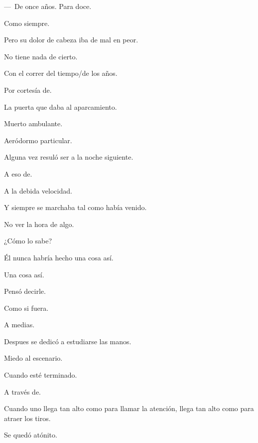 \sk
---~De once años. Para doce. 

\sk
Como siempre. 

\sk
Pero su dolor de cabeza iba de mal en peor. 

\sk
No tiene nada de cierto. 

\sk
Con el correr del tiempo/de los años. 

\sk
Por cortesía de. 

\sk
La puerta que daba al aparcamiento. 

\sk
Muerto ambulante. 

\sk
Aeródormo particular. 

\sk
Alguna vez resuló ser a la noche siguiente. 

\sk
A eso de. 

\sk
A la debida velocidad. 

\sk
Y siempre se marchaba tal como había venido. 

\sk
No ver la hora de algo. 

\sk
¿Cómo lo sabe? 

\sk
Él nunca habría hecho una cosa así.  

\sk
Una cosa así. 

\sk
Pensó decirle. 

\sk
Como si fuera. 

\sk
A medias. 

\sk
Despues se dedicó a estudiarse las manos. 

\sk
Miedo al escenario. 

\sk
Cuando esté terminado. 

\sk
A través de. 

\sk
Cuando uno llega tan alto como para llamar la atención, llega tan alto como para atraer los tiros. 

\sk
Se quedó atónito. 


